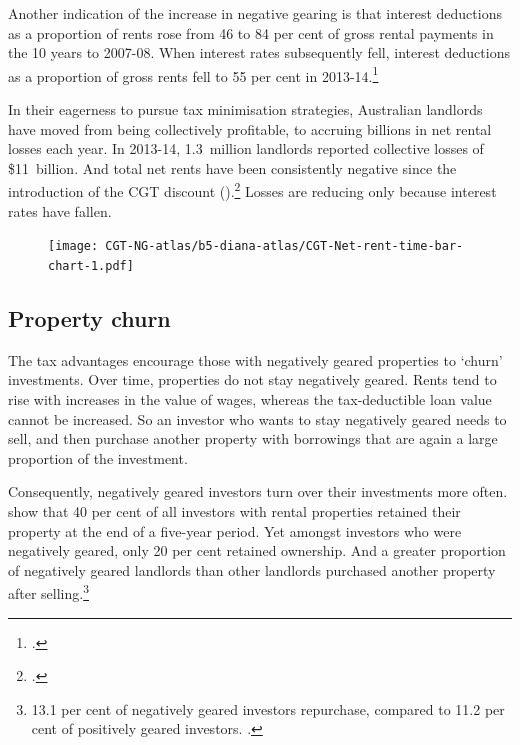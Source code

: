 Another indication of the increase in negative gearing is that interest deductions as a proportion of rents rose from 46 to 84 per cent of gross rental payments in the 10 years to 2007-08. 
When interest rates subsequently fell, interest deductions as a proportion of gross rents fell to 55 per cent in 2013-14.\footcite[][65]{Treasury2015ReThink}


In their eagerness to pursue tax minimisation strategies, Australian landlords have moved from being collectively profitable, to accruing billions in net rental losses each year.
In 2013-14, 1.3~million landlords reported collective losses of \$11~billion. 
And total net rents have been consistently negative since the introduction of the CGT discount ().\footcites{Eslake2013}{ATOTaxstats201314}  
Losses are reducing only because interest rates have fallen.

\begin{figure}[hb]

\texttt{[image: CGT-NG-atlas/b5-diana-atlas/CGT-Net-rent-time-bar-chart-1.pdf]}

\end{figure}

\subsection{Property churn}
The tax advantages encourage those with negatively geared properties to ‘churn’ investments. Over time, properties do not stay negatively geared. Rents tend to rise with increases in the value of wages, whereas the tax-deductible loan value cannot be increased.  So an investor who wants to stay negatively geared needs to sell, and then purchase another property with borrowings that are again a large proportion of the investment.

Consequently, negatively geared investors turn over their investments more often. 
\textcite[][28]{WoodOng2010} show that 40 per cent of all investors with rental properties retained their property at the end of a five-year period.  
Yet amongst investors who were negatively geared, only 20 per cent retained ownership. And a greater proportion of negatively geared landlords than other landlords purchased another property after selling.\footnote{13.1 per cent of negatively geared investors repurchase, compared to 11.2 per cent of positively geared investors. \textcite[][28]{WoodOng2010}.}  

